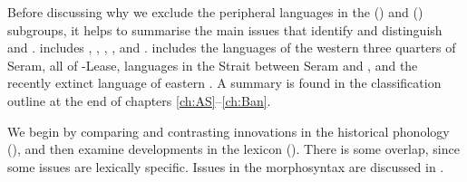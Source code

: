 Before discussing why we exclude the peripheral languages in
the  () and  () subgroups,
it helps to summarise the main issues that identify
and distinguish  and .
 includes , ,
, , and .
 includes the languages of the western three
quarters of Seram, all of -Lease, languages in the  Strait between Seram
and , and the recently extinct  language of eastern .
A summary is found in the classification outline
at the end of chapters \ref{ch:AS}--\ref{ch:Ban}.

We begin by comparing
and contrasting innovations in the historical phonology (),
and then examine developments in the lexicon ().
There is some overlap,
since some issues are lexically specific.
Issues in the morphosyntax are discussed in .
